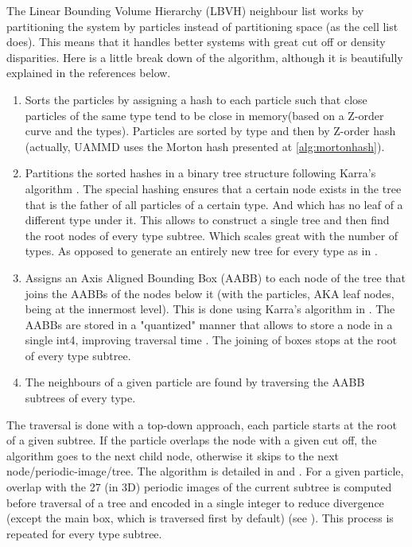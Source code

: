 \documentclass[ twoside,openright,titlepage,numbers=noenddot,%
headinclude,footinclude,cleardoublepage=empty,abstract=on,
BCOR=5mm,paper=a4,fontsize=11pt, dvipsnames
]{scrreprt}
\begin{document}
The Linear Bounding Volume Hierarchy (LBVH) neighbour list works by partitioning the system by particles instead of partitioning space (as the cell list does). This means that it handles better systems with great cut off or density disparities.
Here is a little break down of the algorithm, although it is beautifully explained in the references below.
\begin{enumerate}
\item Sorts the particles by assigning a hash to each particle such
  that close particles of the same type tend to be close in
  memory(based on a Z-order curve and the types).  Particles are
  sorted by type and then by Z-order hash (actually, UAMMD uses the Morton hash presented at \ref{alg:mortonhash}).
\item Partitions the sorted
  hashes in a binary tree structure following Karra's algorithm \cite{Karras2012}.
  The special hashing ensures that a certain node exists in the tree
  that is the father of all particles of a certain type. And which has
  no leaf of a different type under it.  This allows to construct a
  single tree and then find the root nodes of every type
  subtree. Which scales great with the number of types. As opposed to
  generate an entirely new tree for every type as in \cite{Howard2016,Howard2019}.
\item Assigns an Axis Aligned Bounding Box (AABB) to each node of the
  tree that joins the AABBs of the nodes below it (with the particles,
  AKA leaf nodes, being at the innermost level). This is done using
  Karra's algorithm in \cite{Karras2012}.  The AABBs are stored in a "quantized"
  manner that allows to store a node in a single int4, improving
  traversal time \cite{Howard2019}.  The joining of boxes stops at the root of every
  type subtree.
\item The neighbours of a given particle are found by
  traversing the AABB subtrees of every type\cite{Torres2009}.
\end{enumerate}
The traversal is done with a top-down approach, each particle starts at the root of a given subtree. If the particle overlaps the node with a given cut off, the algorithm goes to the next child node, otherwise it skips to the next node/periodic-image/tree. The algorithm is detailed in \cite{Howard2016} and \cite{Torres2009}.
For a given particle, overlap with the 27 (in 3D) periodic images of the current subtree is computed before traversal of a tree and encoded in a single integer to reduce divergence (except the main box, which is traversed first by default) (see \cite{Howard2019}).
This process is repeated for every type subtree.
\end{document}
